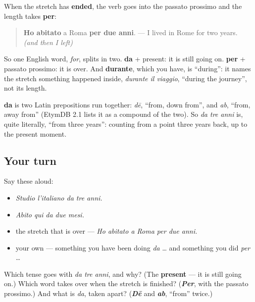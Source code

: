 \begin{grammarlens}[title={Grammar Lens: per, for a stretch that is over}]
When the stretch has \textbf{ended}, the verb goes into the passato prossimo and the length takes \textbf{per}:

\begin{quote}
\textbf{Ho abitato} a Roma \textbf{per due anni}. — I lived in Rome for two years. \emph{(and then I left)}
\end{quote}

So one English word, \emph{for}, splits in two. \textbf{da} + present: it is still going on. \textbf{per} + passato prossimo: it is over. And \textbf{durante}, which you have, is \textquotedblleft{}during\textquotedblright{}: it names the stretch something happened inside, \emph{durante il viaggio}, \textquotedblleft{}during the journey\textquotedblright{}, not its length.
\end{grammarlens}

\begin{cousinweb}
\textbf{da} is two Latin prepositions run together: \emph{dē}, \textquotedblleft{}from, down from\textquotedblright{}, and \emph{ab}, \textquotedblleft{}from, away from\textquotedblright{} (EtymDB 2.1 lists it as a compound of the two). So \emph{da tre anni} is, quite literally, \textquotedblleft{}from three years\textquotedblright{}: counting from a point three years back, up to the present moment.
\end{cousinweb}

\subsection*{Your turn}
Say these aloud:

\begin{itemize}
\raggedright
  \item \emph{Studio l'italiano da tre anni.}
  \item \emph{Abito qui da due mesi.}
  \item the stretch that is over — \emph{Ho abitato a Roma per due anni.}
  \item your own — something you have been doing \emph{da} … and something you did \emph{per} …
\end{itemize}

\begin{tcolorbox}[breakable,colback=teal!4,colframe=teal!35!black,title={Before you move on}]
Which tense goes with \emph{da tre anni}, and why? (The \textbf{present} — it is still going on.) Which word takes over when the stretch is finished? (\emph{\textbf{Per}}, with the passato prossimo.) And what is \emph{da}, taken apart? (\emph{\textbf{Dē}} and \emph{\textbf{ab}}, \textquotedblleft{}from\textquotedblright{} twice.)
\end{tcolorbox}
